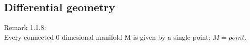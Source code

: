 

\subsection{Differential geometry}
Remark 1.1.8:\\
Every connected 0-dimesional manifold M is given by a single point: $M={point}$.

\pagebreak
